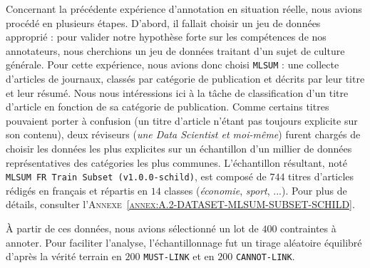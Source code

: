 			Concernant la précédente expérience d'annotation en situation réelle, nous avions procédé en plusieurs étapes.
			D'abord, il fallait choisir un jeu de données approprié : pour valider notre hypothèse forte sur les compétences de nos annotateurs, nous cherchions un jeu de données traitant d'un sujet de culture générale.
			Pour cette expérience, nous avions donc choisi \texttt{MLSUM} : une collecte d'articles de journaux, classés par catégorie de publication et décrits par leur titre et leur résumé.
			Nous nous intéressions ici à la tâche de classification d'un titre d'article en fonction de sa catégorie de publication.
			Comme certains titres pouvaient porter à confusion (un titre d'article n'étant pas toujours explicite sur son contenu), deux réviseurs (\textit{une Data Scientist et moi-même}) furent chargés de choisir les données les plus explicites sur un échantillon d'un millier de données représentatives des catégories les plus communes.
			L'échantillon résultant, noté \texttt{MLSUM FR Train Subset (v1.0.0-schild)}, est composé de $744$ titres d'articles rédigés en français et répartis en $14$ classes (\textit{économie}, \textit{sport}, ...).
			Pour plus de détails, consulter l'\textsc{Annexe~\ref{annex:A.2-DATASET-MLSUM-SUBSET-SCHILD}}.
		
			À partir de ces données, nous avions sélectionné un lot de $400$ contraintes à annoter.
			Pour faciliter l'analyse, l'échantillonnage fut un tirage aléatoire équilibré d'après la vérité terrain en $200$ \texttt{MUST-LINK} et en $200$ \texttt{CANNOT-LINK}.
			

